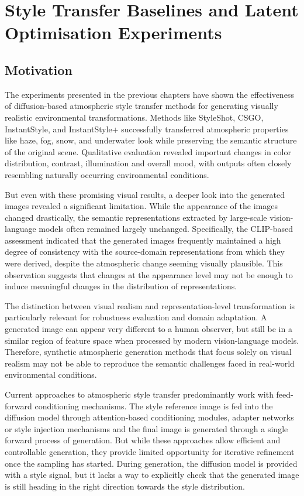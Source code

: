 \chapter{Style Transfer Baselines and Latent Optimisation Experiments}
\label{chap:csd_style}

\section{Motivation}
\label{sec:ch7_motivation}

The experiments presented in the previous chapters have shown the effectiveness of diffusion-based atmospheric style transfer methods for generating visually realistic environmental transformations. Methods like StyleShot, CSGO, InstantStyle, and InstantStyle+ successfully transferred atmospheric properties like haze, fog, snow, and underwater look while preserving the semantic structure of the original scene. Qualitative evaluation revealed important changes in color distribution, contrast, illumination and overall mood, with outputs often closely resembling naturally occurring environmental conditions.

But even with these promising visual results, a deeper look into the generated images revealed a significant limitation. While the appearance of the images changed drastically, the semantic representations extracted by large-scale vision-language models often remained largely unchanged. Specifically, the CLIP-based assessment indicated that the generated images frequently maintained a high degree of consistency with the source-domain representations from which they were derived, despite the atmospheric change seeming visually plausible. This observation suggests that changes at the appearance level may not be enough to induce meaningful changes in the distribution of representations.

The distinction between visual realism and representation-level transformation is particularly relevant for robustness evaluation and domain adaptation. A generated image can appear very different to a human observer, but still be in a similar region of feature space when processed by modern vision-language models. Therefore, synthetic atmospheric generation methods that focus solely on visual realism may not be able to reproduce the semantic challenges faced in real-world environmental conditions.

Current approaches to atmospheric style transfer predominantly work with feed-forward conditioning mechanisms. The style reference image is fed into the diffusion model through attention-based conditioning modules, adapter networks or style injection mechanisms and the final image is generated through a single forward process of generation. But while these approaches allow efficient and controllable generation, they provide limited opportunity for iterative refinement once the sampling has started. During generation, the diffusion model is provided with a style signal, but it lacks a way to explicitly check that the generated image is still heading in the right direction towards the style distribution.

